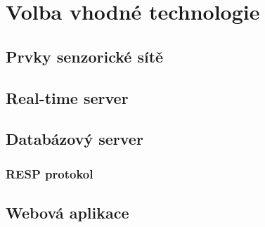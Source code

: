 \chapter{Volba vhodné technologie}

\section{Prvky senzorické sítě}
\section{Real-time server}

\section{Databázový server}
\subsection{RESP protokol}

\section{Webová aplikace}